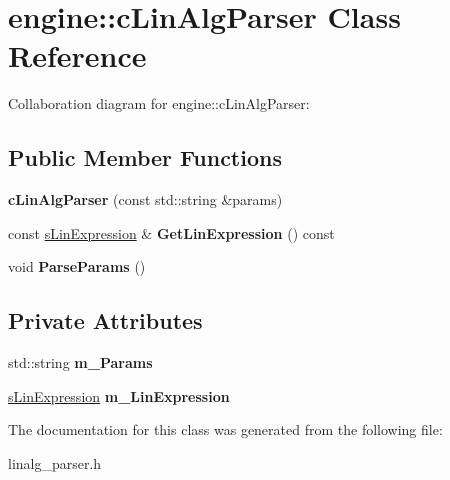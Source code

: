 \hypertarget{classengine_1_1cLinAlgParser}{\section{engine\-:\-:c\-Lin\-Alg\-Parser Class Reference}
\label{classengine_1_1cLinAlgParser}
}


Collaboration diagram for engine\-:\-:c\-Lin\-Alg\-Parser\-:
\subsection*{Public Member Functions}
\begin{DoxyCompactItemize}
\item 
\hypertarget{classengine_1_1cLinAlgParser_a6369536164de16187aedab6e4b9b76a8}{{\bfseries c\-Lin\-Alg\-Parser} (const std\-::string \&params)}\label{classengine_1_1cLinAlgParser_a6369536164de16187aedab6e4b9b76a8}

\item 
\hypertarget{classengine_1_1cLinAlgParser_a8f9de9da32b35ae3573bcdb0ab2bb495}{const \hyperlink{structengine_1_1sLinExpression}{s\-Lin\-Expression} \& {\bfseries Get\-Lin\-Expression} () const }\label{classengine_1_1cLinAlgParser_a8f9de9da32b35ae3573bcdb0ab2bb495}

\item 
\hypertarget{classengine_1_1cLinAlgParser_a9a23d51df31540dc963e6243766ede95}{void {\bfseries Parse\-Params} ()}\label{classengine_1_1cLinAlgParser_a9a23d51df31540dc963e6243766ede95}

\end{DoxyCompactItemize}
\subsection*{Private Attributes}
\begin{DoxyCompactItemize}
\item 
\hypertarget{classengine_1_1cLinAlgParser_a36ea24be1ea26ff93f18e864953cda55}{std\-::string {\bfseries m\-\_\-\-Params}}\label{classengine_1_1cLinAlgParser_a36ea24be1ea26ff93f18e864953cda55}

\item 
\hypertarget{classengine_1_1cLinAlgParser_a1b1c5374cb4d99c51a940dd0c9ff5179}{\hyperlink{structengine_1_1sLinExpression}{s\-Lin\-Expression} {\bfseries m\-\_\-\-Lin\-Expression}}\label{classengine_1_1cLinAlgParser_a1b1c5374cb4d99c51a940dd0c9ff5179}

\end{DoxyCompactItemize}


The documentation for this class was generated from the following file\-:\begin{DoxyCompactItemize}
\item 
linalg\-\_\-parser.\-h\end{DoxyCompactItemize}
